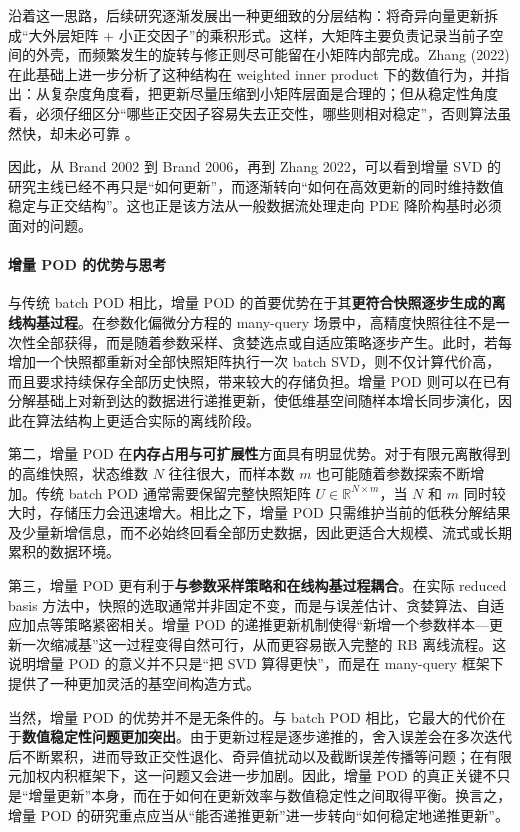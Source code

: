 沿着这一思路，后续研究逐渐发展出一种更细致的分层结构：将奇异向量更新拆成“大外层矩阵 + 小正交因子”的乘积形式。这样，大矩阵主要负责记录当前子空间的外壳，而频繁发生的旋转与修正则尽可能留在小矩阵内部完成。Zhang (2022) 在此基础上进一步分析了这种结构在 weighted inner product 下的数值行为，并指出：从复杂度角度看，把更新尽量压缩到小矩阵层面是合理的；但从稳定性角度看，必须仔细区分“哪些正交因子容易失去正交性，哪些则相对稳定”，否则算法虽然快，却未必可靠 \cite{zhang2022}。

因此，从 Brand 2002 到 Brand 2006，再到 Zhang 2022，可以看到增量 SVD 的研究主线已经不再只是“如何更新”，而逐渐转向“如何在高效更新的同时维持数值稳定与正交结构”。这也正是该方法从一般数据流处理走向 PDE 降阶构基时必须面对的问题。

\paragraph{增量 POD 的优势与思考}

与传统 batch POD 相比，增量 POD 的首要优势在于其\textbf{更符合快照逐步生成的离线构基过程}。在参数化偏微分方程的 many-query 场景中，高精度快照往往不是一次性全部获得，而是随着参数采样、贪婪选点或自适应策略逐步产生。此时，若每增加一个快照都重新对全部快照矩阵执行一次 batch SVD，则不仅计算代价高，而且要求持续保存全部历史快照，带来较大的存储负担。增量 POD 则可以在已有分解基础上对新到达的数据进行递推更新，使低维基空间随样本增长同步演化，因此在算法结构上更适合实际的离线阶段。

第二，增量 POD 在\textbf{内存占用与可扩展性}方面具有明显优势。对于有限元离散得到的高维快照，状态维数 $N$ 往往很大，而样本数 $m$ 也可能随着参数探索不断增加。传统 batch POD 通常需要保留完整快照矩阵 $U\in\mathbb R^{N\times m}$，当 $N$ 和 $m$ 同时较大时，存储压力会迅速增大。相比之下，增量 POD 只需维护当前的低秩分解结果及少量新增信息，而不必始终回看全部历史数据，因此更适合大规模、流式或长期累积的数据环境。

第三，增量 POD 更有利于\textbf{与参数采样策略和在线构基过程耦合}。在实际 reduced basis 方法中，快照的选取通常并非固定不变，而是与误差估计、贪婪算法、自适应加点等策略紧密相关。增量 POD 的递推更新机制使得“新增一个参数样本—更新一次缩减基”这一过程变得自然可行，从而更容易嵌入完整的 RB 离线流程。这说明增量 POD 的意义并不只是“把 SVD 算得更快”，而是在 many-query 框架下提供了一种更加灵活的基空间构造方式。

当然，增量 POD 的优势并不是无条件的。与 batch POD 相比，它最大的代价在于\textbf{数值稳定性问题更加突出}。由于更新过程是逐步递推的，舍入误差会在多次迭代后不断累积，进而导致正交性退化、奇异值扰动以及截断误差传播等问题；在有限元加权内积框架下，这一问题又会进一步加剧。因此，增量 POD 的真正关键不只是“增量更新”本身，而在于如何在更新效率与数值稳定性之间取得平衡。换言之，增量 POD 的研究重点应当从“能否递推更新”进一步转向“如何稳定地递推更新”。


